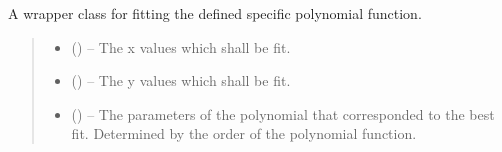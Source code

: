 \documentclass[letterpaper,11pt,english]{sphinxmanual}
\begin{document}
\begin{savenotes}
\begin{fulllineitems}
\begin{savenotes}\begin{fulllineitems}
\label{\detokenize{code/opihiexarata.propagate.polynomial:opihiexarata.propagate.polynomial.LinearPropagationEngine.__fit_polynomial_function}}
\pysigstartsignatures
{}
\pysigstopsignatures
\sphinxAtStartPar
A wrapper class for fitting the defined specific polynomial function.
\begin{quote}\begin{description}
\begin{itemize}
\item {} 
\sphinxAtStartPar
{} () – The x values which shall be fit.

\item {} 
\sphinxAtStartPar
{} () – The y values which shall be fit.

\end{itemize}

\sphinxAtStartPar
\begin{itemize}
\item {} 
\sphinxAtStartPar
{} () – The parameters of the polynomial that corresponded to the best fit.
Determined by the order of the polynomial function.


\end{itemize}
\end{description}
\end{quote}
\end{fulllineitems}
\end{savenotes}
\end{fulllineitems}
\end{savenotes}
\end{document}
